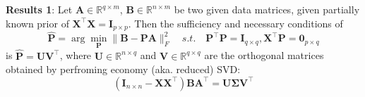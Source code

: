 \documentclass[titlepage,11pt,twoside]{article}
\begin{document}
\textbf{Results 1}: Let $\mathbf{A}\in \mathbb{R}^{q\times m}$, $\mathbf{B}\in \mathbb{R}^{n\times m}$ be two given data matrices, given partially known prior of $\mathbf{X}^{\top}\mathbf{X}=\mathbf{I}_{p\times p}$. Then the sufficiency and necessary conditions of
\begin{equation}
\mathbf{\hat{P}}=\arg\min_{\mathbf{P}}\|\mathbf{B}-\mathbf{P}\mathbf{A}\|_{F}^{2}
\quad
s.t.
\quad
\mathbf{P}^{\top}\mathbf{P} = \mathbf{I}_{q\times q}, \mathbf{X}^{\top}\mathbf{P} = \mathbf{0}_{p\times q} 
\end{equation}
is $\mathbf{\hat{P}} = \mathbf{U}\mathbf{V}^{\top}$, where $\mathbf{U}\in \mathbb{R}^{n\times q}$ and $\mathbf{V}\in \mathbb{R}^{q\times q}$ are the orthogonal matrices obtained by perfroming economy (aka. reduced) SVD:
\begin{equation}
(\mathbf{I}_{n\times n}-\mathbf{X}\mathbf{X}^{\top})\mathbf{B}\mathbf{A}^{\top} = \mathbf{U}\mathbf{\Sigma}\mathbf{V}^{\top}
\end{equation}
\end{document}
